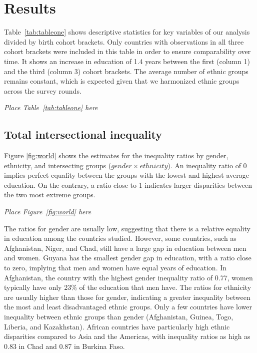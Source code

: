 \hypertarget{results}{%
\section{Results}\label{results}}

Table~\ref{tab:tableone} shows descriptive statistics for key variables of our analysis divided by birth cohort brackets. Only countries with observations in all three cohort brackets were included in this table in order to ensure comparability over time. It shows an increase in education of 1.4 years between the first (column 1) and the third (column 3) cohort brackets. The average number of ethnic groups remains constant, which is expected given that we harmonized ethnic groups across the survey rounds.   

\begin{center}
    \textit{Place Table~\ref{tab:tableone} here}
\end{center}

\hypertarget{intersectional-inequality}{%
\subsection{Total intersectional inequality}\label{intersectional-inequality}}

Figure \ref{fig:world} shows the estimates for the inequality ratios by gender, ethnicity, and intersecting groups ($gender \times ethnicity$). An inequality ratio of 0 implies perfect equality between the groups with the lowest and highest average education. On the contrary, a ratio close to 1 indicates larger disparities between the two most extreme groups.

\begin{center}
    \textit{Place Figure~\ref{fig:world} here}
\end{center}

The ratios for gender are usually low, suggesting that there is a relative equality in education among the countries studied. However, some countries, such as Afghanistan, Niger, and Chad, still have a large gap in education between men and women. Guyana has the smallest gender gap in education, with a ratio close to zero, implying that men and women have equal years of education. In Afghanistan, the country with the highest gender inequality ratio of 0.77, women typically have only 23\% of the education that men have. The ratios for ethnicity are usually higher than those for gender, indicating a greater inequality between the most and least disadvantaged ethnic groups. Only a few countries have lower inequality between ethnic groups than gender (Afghanistan, Guinea, Togo, Liberia, and Kazakhstan). African countries have particularly high ethnic disparities compared to Asia and the Americas, with inequality ratios as high as 0.83 in Chad and 0.87 in Burkina Faso. 

